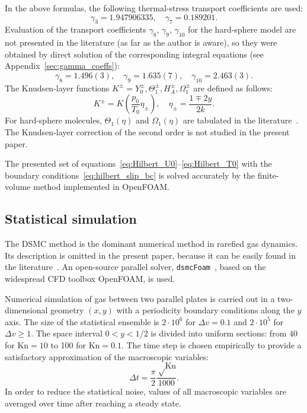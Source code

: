 \documentclass[aip,pof,preprint]{revtex4-1}
\newcommand{\Kn}{\mathrm{Kn}}
\begin{document}
In the above formulas, the following thermal-stress transport coefficients are used:
\begin{equation}\label{eq:gamma_tabular}
    \gamma_3 = 1.947906335, \quad \gamma_7 = 0.189201.
\end{equation}
Evaluation of the transport coefficients \(\gamma_8\), \(\gamma_9\), \(\gamma_{10}\)
for the hard-sphere model are not presented in the literature (as far as the author is aware),
so they were obtained by direct solution of the corresponding integral equations
(see Appendix~\ref{sec:gamma_coeffs}):
\begin{equation}\label{eq:gamma_numerical}
    \gamma_8 = 1.496(3), \quad \gamma_9 = 1.635(7), \quad \gamma_{10} = 2.463(3).
\end{equation}
The Knudsen-layer functions \(K^\pm = Y_0^\pm, \Theta_1^\pm, H_A^\pm, \Omega_1^\pm\)
are defined as follows:
\begin{equation}\label{eq:nonlinear_knudsen_functions}
     K^\pm = K\left(\frac{p_0}{T_0}\eta_\pm\right), \quad \eta_\pm = \frac{1 \mp 2y}{2k}.
\end{equation}
For hard-sphere molecules, \(\Theta_1(\eta)\) and \(\Omega_1(\eta)\)
are tabulated in the literature~\cite{Ohwada1992, Sone2002, Sone2007}.
The Knudsen-layer correction of the second order is not studied in the present paper.

The presented set of equations~\eqref{eq:Hilbert_U0}--\eqref{eq:Hilbert_T0}
with the boundary conditions~\eqref{eq:hilbert_slip_bc}
is solved accurately by the finite-volume method
implemented in OpenFOAM\textregistered{}.

\subsection{Statistical simulation}

The DSMC method is the dominant numerical method in rarefied gas dynamics.
Its description is omitted in the present paper,
because it can be easily found in the literature~\cite{Bird1994, Sone2007}.
An open-source parallel solver, \verb+dsmcFoam+~\cite{Reese2010},
based on the widespread CFD toolbox OpenFOAM\textregistered{}, is used.

Numerical simulation of gas between two parallel plates is carried out
in a two-dimensional geometry \((x,y)\) with a periodicity boundary conditions along the \(y\) axis.
The size of the statistical ensemble is \(2\cdot10^6\) for \(\Delta{v}=0.1\)
and \(2\cdot10^5\) for \(\Delta{v}\ge1\).
The space interval \(0<y<1/2\) is divided into uniform sections:
from 40 for \(\Kn=10\) to 100 for \(\Kn=0.1\).
The time step is chosen empirically to provide a satisfactory approximation of the macroscopic variables:
\begin{equation}\label{eq:dsmc_timestep}
    \Delta{t} = \frac\pi2 \frac{\sqrt\Kn}{1000}.
\end{equation}
In order to reduce the statistical noise, values of all macroscopic variables
are averaged over time after reaching a steady state.
\end{document}
